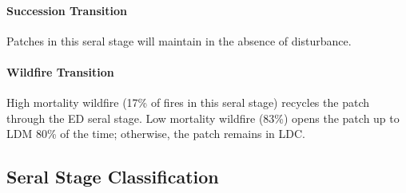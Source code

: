 \paragraph{Succession Transition} Patches in this seral stage will maintain in the absence of disturbance.

\paragraph{Wildfire Transition} High mortality wildfire (17\% of fires in this seral stage) recycles the patch through the ED seral stage. Low mortality wildfire (83\%) opens the patch up to LDM 80\% of the time; otherwise, the patch remains in LDC.

\noindent\hrulefill




\subsection*{Seral Stage Classification}
